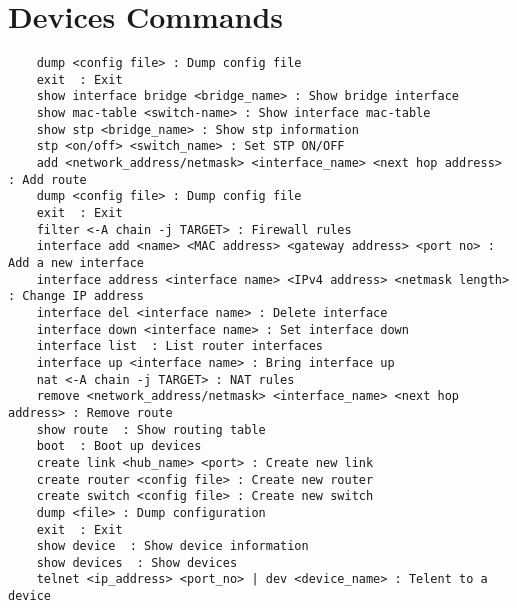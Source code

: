 \chapter{Devices Commands}
\label{ch:commands}

\lstset{language=TeX,caption=Device commands ,label=lst:dev-commands}
\begin{lstlisting}
	dump <config file> : Dump config file
	exit  : Exit
	show interface bridge <bridge_name> : Show bridge interface
	show mac-table <switch-name> : Show interface mac-table
	show stp <bridge_name> : Show stp information
	stp <on/off> <switch_name> : Set STP ON/OFF
	add <network_address/netmask> <interface_name> <next hop address> : Add route
	dump <config file> : Dump config file
	exit  : Exit
	filter <-A chain -j TARGET> : Firewall rules
	interface add <name> <MAC address> <gateway address> <port no> : Add a new interface
	interface address <interface name> <IPv4 address> <netmask length> : Change IP address
	interface del <interface name> : Delete interface
	interface down <interface name> : Set interface down
	interface list  : List router interfaces
	interface up <interface name> : Bring interface up
	nat <-A chain -j TARGET> : NAT rules
	remove <network_address/netmask> <interface_name> <next hop address> : Remove route
	show route  : Show routing table
	boot  : Boot up devices
	create link <hub_name> <port> : Create new link
	create router <config file> : Create new router
	create switch <config file> : Create new switch
	dump <file> : Dump configuration
	exit  : Exit
	show device  : Show device information
	show devices  : Show devices
	telnet <ip_address> <port_no> | dev <device_name> : Telent to a device
\end{lstlisting}
